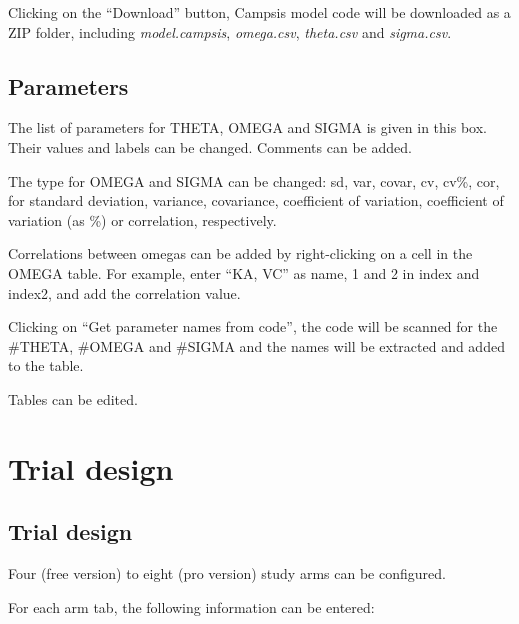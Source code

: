 \documentclass[
]{book}
\begin{document}
Clicking on the ``Download'' button, Campsis model code will be downloaded as a ZIP folder, including \emph{model.campsis}, \emph{omega.csv}, \emph{theta.csv} and \emph{sigma.csv}.

\hypertarget{parameters}{%
\section{Parameters}\label{parameters}}

The list of parameters for THETA, OMEGA and SIGMA is given in this box. Their values and labels can be changed. Comments can be added.

The type for OMEGA and SIGMA can be changed: sd, var, covar, cv, cv\%, cor, for standard deviation, variance, covariance, coefficient of variation, coefficient of variation (as \%) or correlation, respectively.

Correlations between omegas can be added by right-clicking on a cell in the OMEGA table. For example, enter ``KA, VC'' as name, 1 and 2 in index and index2, and add the correlation value.

Clicking on ``Get parameter names from code'', the code will be scanned for the \#THETA, \#OMEGA and \#SIGMA and the names will be extracted and added to the table.

Tables can be edited.

\hypertarget{trial-design}{%
\chapter{Trial design}\label{trial-design}}

\hypertarget{trial-design-1}{%
\section{Trial design}\label{trial-design-1}}

Four (free version) to eight (pro version) study arms can be configured.

For each arm tab, the following information can be entered:
\end{document}
